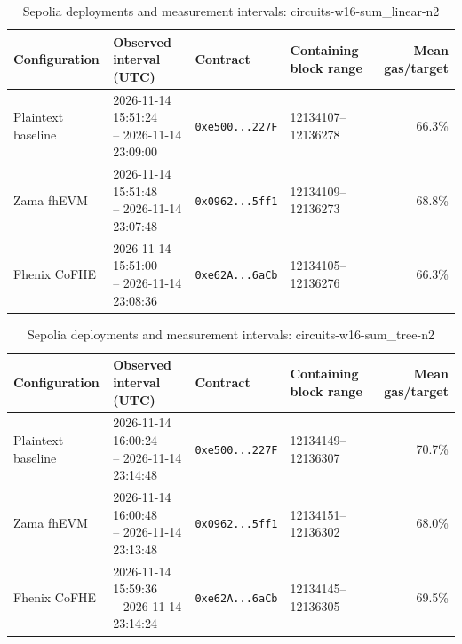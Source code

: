 \begin{table}[!t]
\caption{Sepolia deployments and measurement intervals: circuits-w16-sum\_linear-n2}
\label{tab:sepolia-circuits-w16-sum-linear-n2}
\centering
\footnotesize
\setlength{\tabcolsep}{4pt}
\begin{tabular}{|l|l|l|l|r|}
\hline
\textbf{Configuration} & \textbf{Observed interval (UTC)} & \textbf{Contract} & \textbf{Containing block range} & \textbf{Mean gas/target} \\
\hline
Plaintext baseline & \shortstack[l]{2026-11-14 15:51:24 \\ -- 2026-11-14 23:09:00} & \texttt{0xe500...227F} & 12134107--12136278 & 66.3\% \\
\hline
Zama fhEVM & \shortstack[l]{2026-11-14 15:51:48 \\ -- 2026-11-14 23:07:48} & \texttt{0x0962...5ff1} & 12134109--12136273 & 68.8\% \\
\hline
Fhenix CoFHE & \shortstack[l]{2026-11-14 15:51:00 \\ -- 2026-11-14 23:08:36} & \texttt{0xe62A...6aCb} & 12134105--12136276 & 66.3\% \\
\hline
\end{tabular}
\end{table}

\begin{table}[!t]
\caption{Sepolia deployments and measurement intervals: circuits-w16-sum\_tree-n2}
\label{tab:sepolia-circuits-w16-sum-tree-n2}
\centering
\footnotesize
\setlength{\tabcolsep}{4pt}
\begin{tabular}{|l|l|l|l|r|}
\hline
\textbf{Configuration} & \textbf{Observed interval (UTC)} & \textbf{Contract} & \textbf{Containing block range} & \textbf{Mean gas/target} \\
\hline
Plaintext baseline & \shortstack[l]{2026-11-14 16:00:24 \\ -- 2026-11-14 23:14:48} & \texttt{0xe500...227F} & 12134149--12136307 & 70.7\% \\
\hline
Zama fhEVM & \shortstack[l]{2026-11-14 16:00:48 \\ -- 2026-11-14 23:13:48} & \texttt{0x0962...5ff1} & 12134151--12136302 & 68.0\% \\
\hline
Fhenix CoFHE & \shortstack[l]{2026-11-14 15:59:36 \\ -- 2026-11-14 23:14:24} & \texttt{0xe62A...6aCb} & 12134145--12136305 & 69.5\% \\
\hline
\end{tabular}
\end{table}

